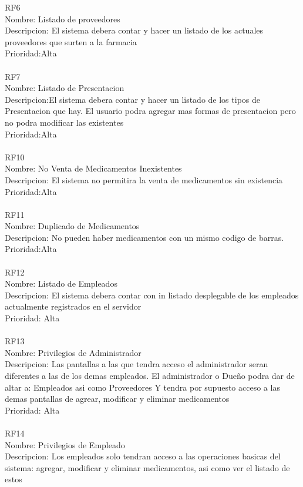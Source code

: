 RF6\\
Nombre: Listado de proveedores\\
Descripcion: El sistema debera contar y hacer un listado de los actuales proveedores que
surten a la farmacia\\
Prioridad:Alta\\
\\
RF7\\
Nombre: Listado de Presentacion\\
Descripcion:El sistema debera contar y hacer un listado de los tipos de Presentacion que hay.
El usuario podra agregar mas formas de presentacion pero no podra modificar las existentes\\
Prioridad:Alta\\
\\
RF10\\
Nombre: No Venta de Medicamentos Inexistentes\\
Descripcion: El sistema no permitira la venta de medicamentos sin existencia\\
Prioridad:Alta\\
\\
RF11\\
Nombre: Duplicado de Medicamentos\\
Descripcion: No pueden haber medicamentos con un mismo codigo de barras.\\
Prioridad:Alta\\
\\
RF12\\
Nombre: Listado de Empleados\\
Descripcion: El sistema debera contar con in listado desplegable de los empleados actualmente registrados en el servidor\\
Prioridad: Alta\\
\\
RF13\\
Nombre: Privilegios de Administrador\\
Descripcion: Las pantallas a las que tendra acceso el administrador seran diferentes a las de los demas empleados. El administrador o Dueño podra dar de altar a: Empleados asi como Proveedores Y tendra por supuesto acceso a las demas pantallas de agrear, modificar y eliminar medicamentos\\
Prioridad: Alta\\
\\
RF14\\
Nombre: Privilegios de Empleado\\
Descripcion: Los empleados solo tendran acceso a las operaciones basicas del sistema: agregar, modificar y eliminar medicamentos, asi como ver el listado de estos\\
